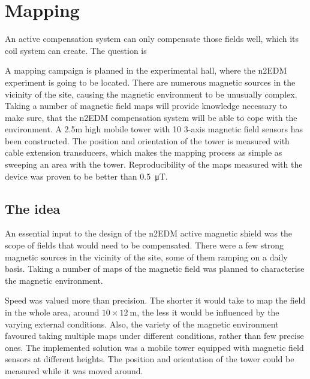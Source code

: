 \chapter{Mapping}
\label{ch:mapping}
An active compensation system can only compensate those fields well, which its coil system can create. The question is


A mapping campaign is planned in the experimental hall, where the n2EDM experiment is going to be located. There are numerous magnetic sources in the vicinity of the site, causing the magnetic environment to be unusually complex. Taking a number of magnetic field maps will provide knowledge necessary to make sure, that the n2EDM compensation system will be able to cope with the environment. A 2.5m high mobile tower with 10 3-axis magnetic field sensors has been constructed. The position and orientation of the tower is measured with cable extension transducers, which makes the mapping process as simple as sweeping an area with the tower. Reproducibility of the maps measured with the device was proven to be better than \SI{0.5}{\micro\tesla}.




\section{The idea}
An essential input to the design of the n2EDM active magnetic shield was the scope of fields that would need to be compensated. There were a few strong magnetic sources in the vicinity of the site, some of them ramping on a daily basis. Taking a number of maps of the magnetic field was planned to characterise the magnetic environment.

Speed was valued more than precision. The shorter it would take to map the field in the whole area, around $10 \times \SI{12}{\metre}$, the less it would be influenced by the varying external conditions. Also, the variety of the magnetic environment favoured taking multiple maps under different conditions, rather than few precise ones.
The implemented solution was a mobile tower equipped with magnetic field sensors at different heights. The position and orientation of the tower could be measured while it was moved around.

